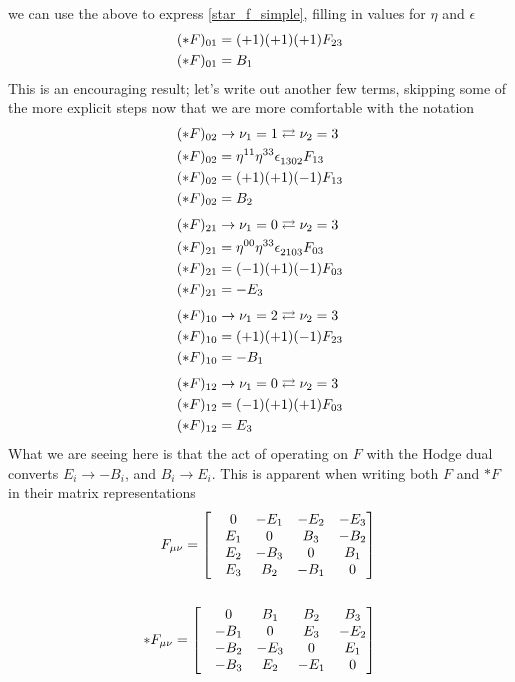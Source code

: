 %
we can use the above to express \ref{star_f_simple}, filling in values for $\eta$ and $\epsilon$
%
\begin{align}
	&(\ast F)_{0 1} = (+1) (+1) (+1) F_{23} \notag \\
	&(\ast F)_{0 1} = B_1
\end{align}
%
This is an encouraging result; let's write out another few terms, skipping some of the more explicit steps now that we are more comfortable with the notation
%
\begin{align}
	&(\ast F)_{0 2} \rightarrow \nu_1 = 1 \rightleftarrows \nu_2 = 3  \notag \\
	&(\ast F)_{0 2} = \eta\indices{^{11}}  \eta\indices{^{33}} \epsilon\indices{_{1302}} F_{13}  \notag \\
	&(\ast F)_{0 2} = (+1) (+1) (-1) F_{13}  \notag \\
	&(\ast F)_{0 2} = B_2
\end{align}
%
\begin{align}
	&(\ast F)_{2 1} \rightarrow \nu_1 = 0 \rightleftarrows \nu_2 = 3  \notag \\
	&(\ast F)_{2 1} = \eta\indices{^{00}}  \eta\indices{^{33}} \epsilon\indices{_{2103}} F_{03}  \notag \\
	&(\ast F)_{2 1} = (-1) (+1) (-1) F_{03}  \notag \\
	&(\ast F)_{2 1} = -E_3
\end{align}
%
\begin{align}
	&(\ast F)_{1 0} \rightarrow \nu_1 = 2 \rightleftarrows \nu_2 = 3  \notag \\
	&(\ast F)_{1 0} = (+1) (+1) (-1) F_{23}  \notag \\
	&(\ast F)_{1 0} = -B_1
\end{align}
%
\begin{align}
	&(\ast F)_{1 2} \rightarrow \nu_1 = 0 \rightleftarrows \nu_2 = 3  \notag \\
	&(\ast F)_{1 2} = (-1) (+1) (+1) F_{03}  \notag \\
	&(\ast F)_{1 2} = E_3
\end{align}
%
What we are seeing here is that the act of operating on $F$ with the Hodge dual converts $E_i \rightarrow -B_i$, and $B_i \rightarrow E_i$. This is apparent when writing both $F$ and $\ast F$ in their matrix representations
%
\begin{align}
	F_{\mu\nu} = \begin{bmatrix}
		&0   &-E_1 &-E_2 &-E_3 \\ 
		&E_1 &0    &B_3  &-B_2 \\
		&E_2 &-B_3 &0    &B_1  \\
		&E_3 &B_2  &-B_1 &0    \\
	\end{bmatrix} \\ \notag
	\\
	\ast F_{\mu\nu} = \begin{bmatrix}
	&0   &B_1 &B_2 &B_3 \\ 
	&-B_1 &0    &E_3  &-E_2 \\
	&-B_2 &-E_3 &0    &E_1  \\
	&-B_3 &E_2  &-E_1 &0    \\
	\end{bmatrix}
\end{align}	
